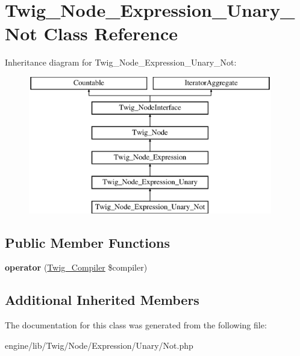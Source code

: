 \hypertarget{class_twig___node___expression___unary___not}{}\section{Twig\+\_\+\+Node\+\_\+\+Expression\+\_\+\+Unary\+\_\+\+Not Class Reference}
\label{class_twig___node___expression___unary___not}
Inheritance diagram for Twig\+\_\+\+Node\+\_\+\+Expression\+\_\+\+Unary\+\_\+\+Not\+:\begin{figure}[H]
\begin{center}
\leavevmode
\includegraphics[height=6.000000cm]{class_twig___node___expression___unary___not}
\end{center}
\end{figure}
\subsection*{Public Member Functions}
\begin{DoxyCompactItemize}
\item 
\hypertarget{class_twig___node___expression___unary___not_af77318ec88d5f8a508684970a150b670}{}{\bfseries operator} (\hyperlink{class_twig___compiler}{Twig\+\_\+\+Compiler} \$compiler)\label{class_twig___node___expression___unary___not_af77318ec88d5f8a508684970a150b670}

\end{DoxyCompactItemize}
\subsection*{Additional Inherited Members}


The documentation for this class was generated from the following file\+:\begin{DoxyCompactItemize}
\item 
engine/lib/\+Twig/\+Node/\+Expression/\+Unary/Not.\+php\end{DoxyCompactItemize}
